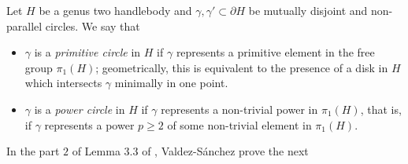 \documentclass[12pt]{amsart}
\newtheorem{lema}{Lemma}
\begin{document}

Let $H$ be a genus two handlebody and $\gamma ,\gamma'\subset\partial H$ be mutually disjoint and non-parallel circles. We say that
\begin{itemize}
\item $\gamma$ is a \emph{primitive circle} in $H$ if $\gamma$ represents a primitive element in the free group $\pi_{1}(H)$; geometrically, this is equivalent to the presence of a disk in $H$ which intersects $\gamma$ minimally in one point.
\item $\gamma$ is a \emph{power circle} in $H$ if $\gamma$ represents a non-trivial power in $\pi_{1}(H)$, that is, if $\gamma$ represents a power $p\geq 2$ of some non-trivial element in $\pi_{1}(H)$.
\end{itemize}
In the part $2$ of Lemma $3.3$ of \cite{Tejano}, Valdez-S\'anchez prove the next
\end{document}

